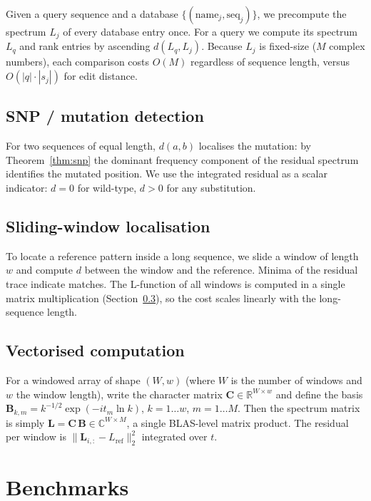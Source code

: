 \documentclass[12pt,a4paper]{article}
\begin{document}
Given a query sequence and a database $\{(\text{name}_j, \text{seq}_j)\}$,
we precompute the spectrum $L_j$ of every database entry once. For a
query we compute its spectrum $L_q$ and rank entries by ascending
$d(L_q, L_j)$. Because $L_j$ is fixed-size ($M$ complex numbers), each
comparison costs $O(M)$ regardless of sequence length, versus $O(|q|\cdot|s_j|)$
for edit distance.

\subsection{SNP / mutation detection}
\label{sec:snp}

For two sequences of equal length, $d(a, b)$ localises the mutation: by
Theorem~\ref{thm:snp} the dominant frequency component of the residual
spectrum identifies the mutated position. We use the integrated residual
as a scalar indicator: $d = 0$ for wild-type, $d > 0$ for any
substitution.

\subsection{Sliding-window localisation}
\label{sec:window}

To locate a reference pattern inside a long sequence, we slide a window
of length $w$ and compute $d$ between the window and the reference.
Minima of the residual trace indicate matches. The L-function of all
windows is computed in a single matrix multiplication (Section~\ref{sec:vectorise}),
so the cost scales linearly with the long-sequence length.

\subsection{Vectorised computation}
\label{sec:vectorise}

For a windowed array of shape $(W, w)$ (where $W$ is the number of
windows and $w$ the window length), write the character matrix
$\mathbf{C} \in \mathbb{R}^{W \times w}$ and define the basis
$\mathbf{B}_{k,m} = k^{-1/2} \exp(-i t_m \ln k)$, $k = 1\dots w$,
$m = 1\dots M$. Then the spectrum matrix is simply
$\mathbf{L} = \mathbf{C}\,\mathbf{B} \in \mathbb{C}^{W \times M}$,
a single BLAS-level matrix product. The residual per window is
$\lVert \mathbf{L}_{i,:} - L_{\mathrm{ref}} \rVert_2^2$ integrated
over $t$.

\section{Benchmarks}
\label{sec:benchmarks}
\end{document}
